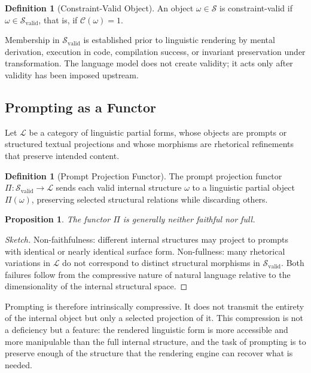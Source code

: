 \documentclass[12pt, a4paper]{article}
\theoremstyle{plain}
\newtheorem{proposition}[theorem]{Proposition}
\theoremstyle{definition}
\newtheorem{definition}[theorem]{Definition}
\theoremstyle{remark}
\begin{document}
\begin{definition}[Constraint-Valid Object]
An object $\omega \in \mathcal{S}$ is constraint-valid if $\omega \in \mathcal{S}_{\mathrm{valid}}$, that is, if $\mathcal{C}(\omega) = 1$.
\end{definition}

Membership in $\mathcal{S}_{\mathrm{valid}}$ is established prior to linguistic rendering by mental derivation, execution in code, compilation success, or invariant preservation under transformation. The language model does not create validity; it acts only after validity has been imposed upstream.

\subsection{Prompting as a Functor}

Let $\mathcal{L}$ be a category of linguistic partial forms, whose objects are prompts or structured textual projections and whose morphisms are rhetorical refinements that preserve intended content.

\begin{definition}[Prompt Projection Functor]
The prompt projection functor $\Pi : \mathcal{S}_{\mathrm{valid}} \to \mathcal{L}$ sends each valid internal structure $\omega$ to a linguistic partial object $\Pi(\omega)$, preserving selected structural relations while discarding others.
\end{definition}

\begin{proposition}
The functor $\Pi$ is generally neither faithful nor full.
\end{proposition}

\begin{proof}[Sketch]
Non-faithfulness: different internal structures may project to prompts with identical or nearly identical surface form. Non-fullness: many rhetorical variations in $\mathcal{L}$ do not correspond to distinct structural morphisms in $\mathcal{S}_{\mathrm{valid}}$. Both failures follow from the compressive nature of natural language relative to the dimensionality of the internal structural space.
\end{proof}

Prompting is therefore intrinsically compressive. It does not transmit the entirety of the internal object but only a selected projection of it. This compression is not a deficiency but a feature: the rendered linguistic form is more accessible and more manipulable than the full internal structure, and the task of prompting is to preserve enough of the structure that the rendering engine can recover what is needed.
\end{document}
